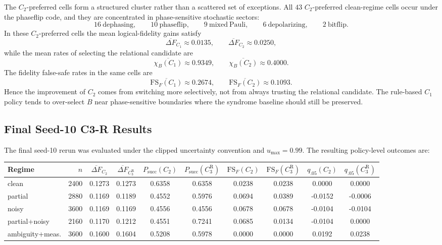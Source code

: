 \documentclass[11pt,a4paper]{article}
\theoremstyle{definition}
\theoremstyle{remark}
\begin{document}
The $C_2$-preferred cells form a structured cluster rather than a scattered set of
exceptions.  All $43$ $C_2$-preferred clean-regime cells occur under the phaseflip
code, and they are concentrated in phase-sensitive stochastic sectors:
\[
16\ \mathrm{dephasing},\qquad
10\ \mathrm{phaseflip},\qquad
9\ \mathrm{mixed\ Pauli},\qquad
6\ \mathrm{depolarizing},\qquad
2\ \mathrm{bitflip}.
\]
In these $C_2$-preferred cells the mean logical-fidelity gains satisfy
\[
\overline{\Delta F}_{C_1}\approx 0.0135,
\qquad
\overline{\Delta F}_{C_2}\approx 0.0250,
\]
while the mean rates of selecting the relational candidate are
\[
\overline{\chi_B(C_1)}\approx 0.9349,
\qquad
\overline{\chi_B(C_2)}\approx 0.4000.
\]
The fidelity false-safe rates in the same cells are
\[
\overline{\mathrm{FS}_{F}(C_1)}\approx 0.2674,
\qquad
\overline{\mathrm{FS}_{F}(C_2)}\approx 0.1093.
\]
Hence the improvement of $C_2$ comes from switching more selectively, not from always
trusting the relational candidate.  The rule-based $C_1$ policy tends to over-select
$B$ near phase-sensitive boundaries where the syndrome baseline should still be
preserved.

\subsection{Final Seed-10 C3-R Results}

The final seed-10 rerun was evaluated under the clipped uncertainty convention and
$u_{\max}=0.99$.  The resulting policy-level outcomes are:

\begin{center}
\scriptsize
\begin{tabular}{l|r|cc|cc|cc|cc}
Regime
& $n$
& $\overline{\Delta F}_{C_2}$
& $\overline{\Delta F}_{C_3^{\mathrm{R}}}$
& $P_{\mathrm{succ}}(C_2)$
& $P_{\mathrm{succ}}(C_3^{\mathrm{R}})$
& $\mathrm{FS}_F(C_2)$
& $\mathrm{FS}_F(C_3^{\mathrm{R}})$
& $q_{.05}(C_2)$
& $q_{.05}(C_3^{\mathrm{R}})$
\\
\hline
clean & 2400 & 0.1273 & 0.1273 & 0.6358 & 0.6358 & 0.0238 & 0.0238 & 0.0000 & 0.0000\\
partial & 2880 & 0.1169 & 0.1189 & 0.4552 & 0.5976 & 0.0694 & 0.0389 & -0.0152 & -0.0006\\
noisy & 3600 & 0.1169 & 0.1169 & 0.4556 & 0.4556 & 0.0678 & 0.0678 & -0.0104 & -0.0104\\
partial+noisy & 2160 & 0.1170 & 0.1212 & 0.4551 & 0.7241 & 0.0685 & 0.0134 & -0.0104 & 0.0000\\
ambiguity+meas. & 3600 & 0.1600 & 0.1604 & 0.5208 & 0.5978 & 0.0000 & 0.0000 & 0.0192 & 0.0238
\end{tabular}
\end{center}
\end{document}
